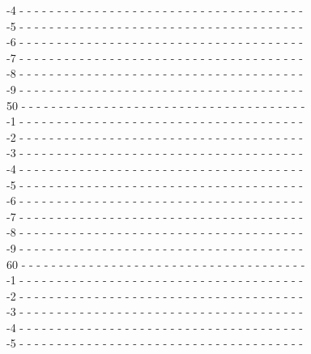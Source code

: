 \documentclass{cmspaper}
\begin{document}
{\begin{flushleft}
-4 - - - - - - - - - - - - - - - - - - - - - - - - - - - - - - - - - - - - - -\\
-5 - - - - - - - - - - - - - - - - - - - - - - - - - - - - - - - - - - - - - -\\
-6 - - - - - - - - - - - - - - - - - - - - - - - - - - - - - - - - - - - - - -\\
-7 - - - - - - - - - - - - - - - - - - - - - - - - - - - - - - - - - - - - - -\\
-8 - - - - - - - - - - - - - - - - - - - - - - - - - - - - - - - - - - - - - -\\
-9 - - - - - - - - - - - - - - - - - - - - - - - - - - - - - - - - - - - - - -\\
50 - - - - - - - - - - - - - - - - - - - - - - - - - - - - - - - - - - - - - -\\
-1 - - - - - - - - - - - - - - - - - - - - - - - - - - - - - - - - - - - - - -\\
-2 - - - - - - - - - - - - - - - - - - - - - - - - - - - - - - - - - - - - - -\\
-3 - - - - - - - - - - - - - - - - - - - - - - - - - - - - - - - - - - - - - -\\
-4 - - - - - - - - - - - - - - - - - - - - - - - - - - - - - - - - - - - - - -\\
-5 - - - - - - - - - - - - - - - - - - - - - - - - - - - - - - - - - - - - - -\\
-6 - - - - - - - - - - - - - - - - - - - - - - - - - - - - - - - - - - - - - -\\
-7 - - - - - - - - - - - - - - - - - - - - - - - - - - - - - - - - - - - - - -\\
-8 - - - - - - - - - - - - - - - - - - - - - - - - - - - - - - - - - - - - - -\\
-9 - - - - - - - - - - - - - - - - - - - - - - - - - - - - - - - - - - - - - -\\
60 - - - - - - - - - - - - - - - - - - - - - - - - - - - - - - - - - - - - - -\\
-1 - - - - - - - - - - - - - - - - - - - - - - - - - - - - - - - - - - - - - -\\
-2 - - - - - - - - - - - - - - - - - - - - - - - - - - - - - - - - - - - - - -\\
-3 - - - - - - - - - - - - - - - - - - - - - - - - - - - - - - - - - - - - - -\\
-4 - - - - - - - - - - - - - - - - - - - - - - - - - - - - - - - - - - - - - -\\
-5 - - - - - - - - - - - - - - - - - - - - - - - - - - - - - - - - - - - - - -\\

\end{flushleft}}
\end{document}
